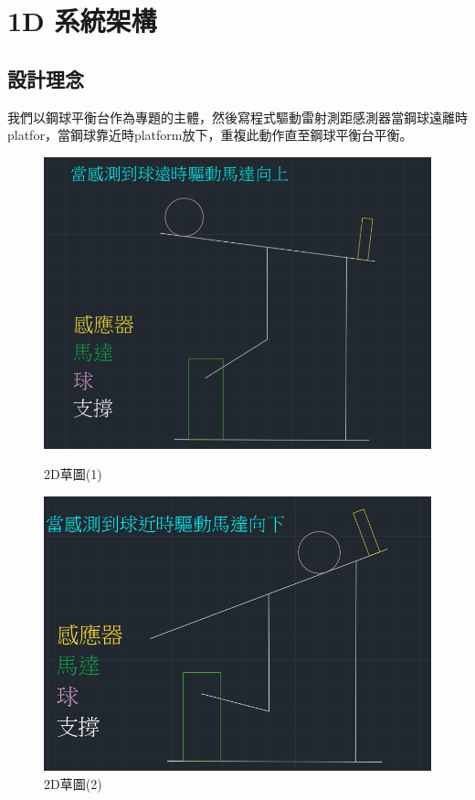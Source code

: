 \section*{1D 系統架構}

\subsection*{設計理念}

我們以鋼球平衡台作為專題的主體，然後寫程式驅動雷射測距感測器當鋼球遠離時platfor，當鋼球靠近時platform放下，重複此動作直至鋼球平衡台平衡。

\begin{figure}[h!]
    \centering
    \begin{minipage}[b]{0.45\textwidth}
        \centering
        \includegraphics[width=\textwidth,height=0.2\textheight]{./../images/螢幕擷取畫面 2024-05-22 181158.png}
        \caption{2D草圖(1)}
    \end{minipage}
    \hfill
    \begin{minipage}[b]{0.45\textwidth}
        \centering
        \includegraphics[width=\textwidth,height=0.2\textheight]{./../images/螢幕擷取畫面 2024-05-22 180925.png} 
        \caption{2D草圖(2)}
    \end{minipage}
\end{figure}

